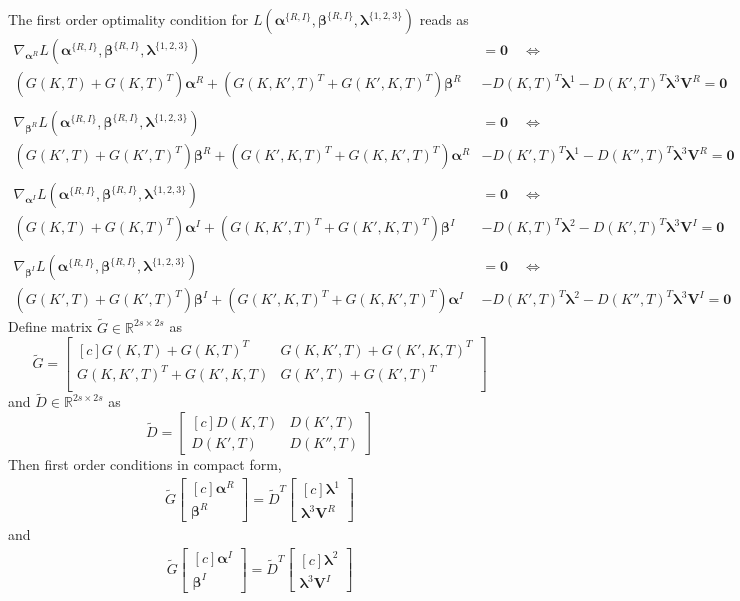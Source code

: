 \documentclass[11pt]{article}
\newcommand{\RR}{\mathbb{R}}
\newcommand{\balpha}{\bm \alpha}
\newcommand{\blambda}{\bm \lambda}
\newcommand{\bbeta}{\bm \beta}
\newcommand{\bmat}[2]{
	\begin{bmatrix*}[#1]
		#2
	\end{bmatrix*}
}
\begin{document}
The first order optimality condition for $ L(\balpha^{\{R,I\}},\bbeta^{\{R,I\}}, \blambda^{\{1,2,3\}}) $ reads as
\begin{align}
	\nabla_{\balpha^R}L(\balpha^{\{R,I\}},\bbeta^{\{R,I\}}, \blambda^{\{1,2,3\}}) &= \bm 0 \quad\Leftrightarrow\\
	\left(G(K,T)+G(K,T)^T \right)\balpha^R + \left(G(K,K',T)^T+G(K',K,T)^T\right)\bbeta^R& - D(K,T)^T\blambda^1-D(K',T)^T\blambda^3\bm V^R = \bm 0\\ \\
\nabla_{\bbeta^R}L(\balpha^{\{R,I\}},\bbeta^{\{R,I\}}, \blambda^{\{1,2,3\}}) &= \bm 0 \quad\Leftrightarrow \\
\left(G(K',T)+G(K',T)^T \right)\bbeta^R + \left(G(K',K,T)^T+G(K,K',T)^T\right)\balpha^R &- D(K',T)^T\blambda^1-D(K'',T)^T\blambda^3\bm V^R = \bm 0\\\\
\nabla_{\balpha^I}L(\balpha^{\{R,I\}},\bbeta^{\{R,I\}}, \blambda^{\{1,2,3\}}) &= \bm 0 \quad\Leftrightarrow\\
\left(G(K,T)+G(K,T)^T \right)\balpha^I + \left(G(K,K',T)^T+G(K',K,T)^T\right)\bbeta^I &- D(K,T)^T\blambda^2-D(K',T)^T\blambda^3\bm V^I = \bm 0\\\\
\nabla_{\bbeta^I}L(\balpha^{\{R,I\}},\bbeta^{\{R,I\}}, \blambda^{\{1,2,3\}}) &= \bm 0 \quad\Leftrightarrow \\
\left(G(K',T)+G(K',T)^T \right)\bbeta^I + \left(G(K',K,T)^T+G(K,K',T)^T\right)\balpha^I &- D(K',T)^T\blambda^2-D(K'',T)^T\blambda^3\bm V^I = \bm 0
\end{align}
Define matrix $ \tilde{G}\in \RR^{2s\times 2s} $ as
\[\tilde{G} = \bmat{c}{G(K,T)+G(K,T)^T & G(K,K',T) + G(K',K,T)^T \\ G(K,K',T)^T + G(K',K,T) &G(K',T)+G(K',T)^T \\ } \]
and $ \tilde{D}\in \RR^{2s\times 2s} $ as
\[\tilde{D} = \bmat{c}{D(K,T) & D(K',T)\\D(K',T) & D(K'',T)  }\]
Then first order conditions in compact form,
\begin{align}
	\tilde{G} \bmat{c}{\balpha^R\\ \bbeta^R} = \tilde{D}^T \bmat{c}{\blambda^1\\ \blambda^3 \bm V^R} 
\end{align}
and 
\begin{align}
\tilde{G} \bmat{c}{\balpha^I\\ \bbeta^I} = \tilde{D}^T \bmat{c}{\blambda^2\\ \blambda^3 \bm V^I} 
\end{align}


\end{document}
